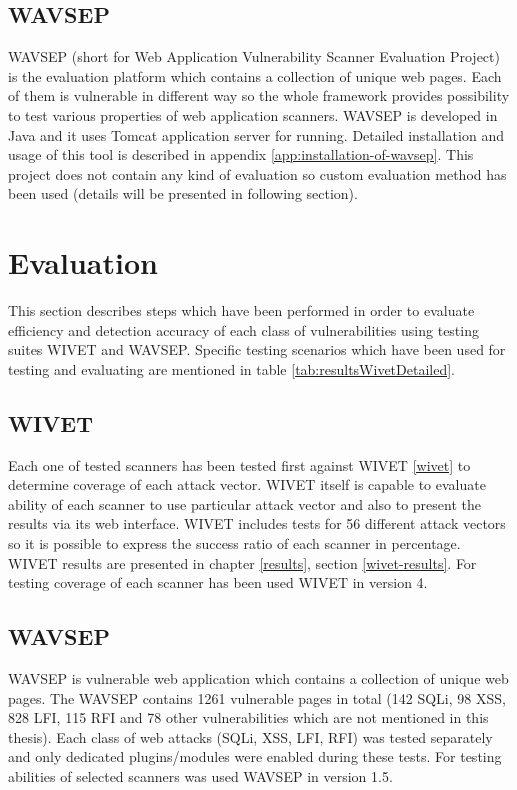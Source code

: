 		\subsection{WAVSEP}\label{wavsep}
		
		WAVSEP \cite{WAVSEP} (short for Web Application Vulnerability Scanner Evaluation Project) is the evaluation platform which contains a collection of unique web pages. Each of them is vulnerable in different way so the whole framework provides possibility to test various properties of web application scanners. WAVSEP is developed in Java and it uses Tomcat \cite{TOMCAT} application server for running. Detailed installation and usage of this tool is described in appendix \ref{app:installation-of-wavsep}. This project does not contain any kind of evaluation so custom evaluation method has been used (details will be presented in following section).
		
	\section{Evaluation}\label{evaluation}
	
	This section describes steps which have been performed in order to evaluate efficiency and detection accuracy of each class of vulnerabilities using testing suites WIVET and WAVSEP. Specific testing scenarios which have been used for testing and evaluating are mentioned in table \ref{tab:resultsWivetDetailed}.
	
		\subsection{WIVET}

		Each one of tested scanners has been tested first against WIVET \ref{wivet} to determine coverage of each attack vector. WIVET itself is capable to evaluate ability of each scanner to use particular attack vector and also to present the results via its web interface. WIVET includes tests for 56 different attack vectors so it is possible to express the success ratio of each scanner in percentage. WIVET results are presented in chapter \ref{results}, section \ref{wivet-results}. For testing coverage of each scanner has been used WIVET in version 4.
	
		\subsection{WAVSEP}	
	
		WAVSEP is vulnerable web application which contains a collection of unique web pages. The WAVSEP contains 1261 vulnerable pages in total (142 SQLi, 98 XSS, 828 LFI, 115 RFI and 78 other vulnerabilities which are not mentioned in this thesis). Each class of web attacks (SQLi, XSS, LFI, RFI) was tested separately and only dedicated plugins/modules were enabled during these tests. For testing abilities of selected scanners was used WAVSEP in version 1.5.
		
